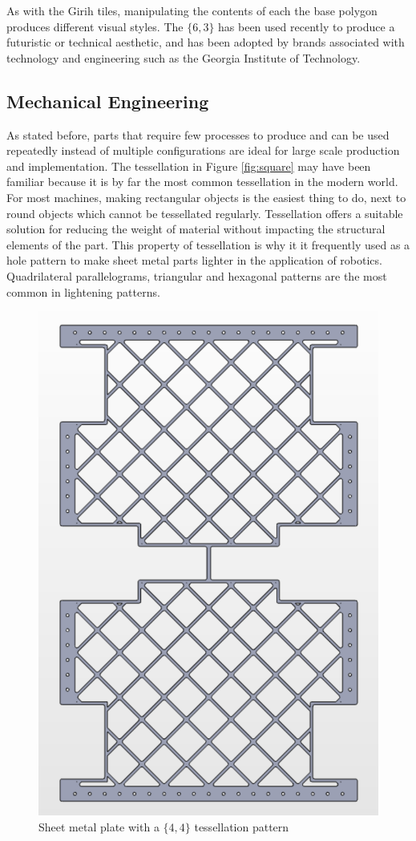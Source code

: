 \documentclass[12pt,letterpaper]{article}
\begin{document}
As with the Girih tiles, manipulating the contents of each the base polygon produces different visual styles. The $\{6,3\}$ has been used recently to produce a futuristic or technical aesthetic, and has been adopted by brands associated with technology and engineering such as the Georgia Institute of Technology. 

\subsection{Mechanical Engineering}
As stated before, parts that require few processes to produce and can be used repeatedly instead of multiple configurations are ideal for large scale production and implementation. The tessellation in Figure \ref{fig:square} may have been familiar because it is by far the most common tessellation in the modern world. For most machines, making rectangular objects is the easiest thing to do, next to round objects which cannot be tessellated regularly. 
Tessellation offers a suitable solution for reducing the weight of material without impacting the structural elements of the part. This property of tessellation is why it it frequently used as a hole pattern to make sheet metal parts lighter in the application of robotics. Quadrilateral parallelograms, triangular and hexagonal patterns are the most common in lightening patterns.

\begin{figure}[H]
    \begin{center}
        \caption{Sheet metal plate with a $\{4,4\}$ tessellation pattern}
        \label{fig:belly}
        \includegraphics[width=.4\linewidth]{belly}
    \end{center}
\end{figure}
\end{document}
